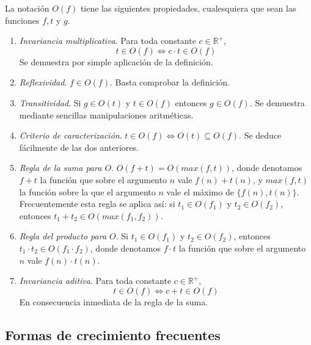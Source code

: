 La notación $O(f)$ tiene las siguientes propiedades, cualesquiera que sean las funciones $f,t$ y $g$.\\
\begin{enumerate}
\item \emph{Invariancia multiplicativa}. Para toda constante $c \in \mathbb{R}^+$,
\[ t \in O(f) \iff c \cdot t \in O(f) \]
Se demuestra por simple aplicación de la definición.
\item \emph{Reflexividad}. $f \in O(f)$. Basta comprobar la definición.
\item \emph{Transitividad}. Si $g \in O(t)$ y $t \in O(f)$ entonces $g \in O(f)$. Se demuestra mediante sencillas manipulaciones aritméticas.
\item \emph{Criterio de caracterización}. $t \in O(f) \iff O(t) \subseteq O(f)$. Se deduce fácilmente de las dos anteriores.
\item \emph{Regla de la suma para $O$}. $O(f+t) = O(max(f,t))$, donde denotamos $f+t$ la función que sobre el argumento $n$ vale $f(n)+t(n)$, y $max(f,t)$ la función sobre la que el argumento $n$ vale el máximo de $\{f(n),t(n)\}$. Frecuentemente esta regla se aplica así: si $t_1 \in O(f_1)$ y $t_2 \in O(f_2)$, entonces $t_1 + t_2 \in O(max(f_1,f_2))$.
\item \emph{Regla del producto para $O$}. Si $t_1 \in O(f_1)$ y $t_2 \in O(f_2)$, entonces $t_1 \cdot t_2 \in O(f_1 \cdot f_2)$, donde denotamos $f \cdot t$ la función que sobre el argumento $n$ vale $f(n) \cdot t(n)$.
\item \emph{Invariancia aditiva}. Para toda constante $c \in \mathbb{R}^{+}$,
\[ t \in O(f) \iff c + t \in O(f) \]
En consecuencia inmediata de la regla de la suma.
\end{enumerate}

\subsection{Formas de crecimiento frecuentes}

